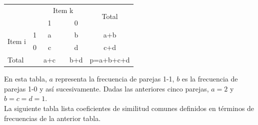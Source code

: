 \documentclass[a4paper, 20pt]{article}
\begin{document}
\begin{table}[]
\begin{tabular}{ll|clc|c|l}
\multicolumn{2}{l|}{\multirow{2}{*}{}} & \multicolumn{3}{c}{Item k} & \multicolumn{2}{c|}{\multirow{2}{*}{Total}} \\
\multicolumn{2}{l|}{}                  & 1        &       & 0       & \multicolumn{2}{c|}{}                        \\ \hline
\multirow{2}{*}{Item i}       & 1      & a        &       & b       & \multicolumn{2}{c|}{a+b}                     \\
                              & 0      & c        &       & d       & \multicolumn{2}{c|}{c+d}                     \\ \hline
\multicolumn{2}{l|}{Total}            & a+c      &       & b+d     & \multicolumn{2}{c|}{p=a+b+c+d}              
\end{tabular}
\end{table}

En esta tabla, $a$ representa la frecuencia de parejas 1-1, $b$ es la frecuencia de parejas 1-0 y así sucesivamente. Dadas las anteriores cinco parejas, $a=2$ y $b=c=d=1$.\\

La siguiente tabla lista coeficientes de similitud comunes definidos en términos de frecuencias de la anterior tabla.
\end{document}
